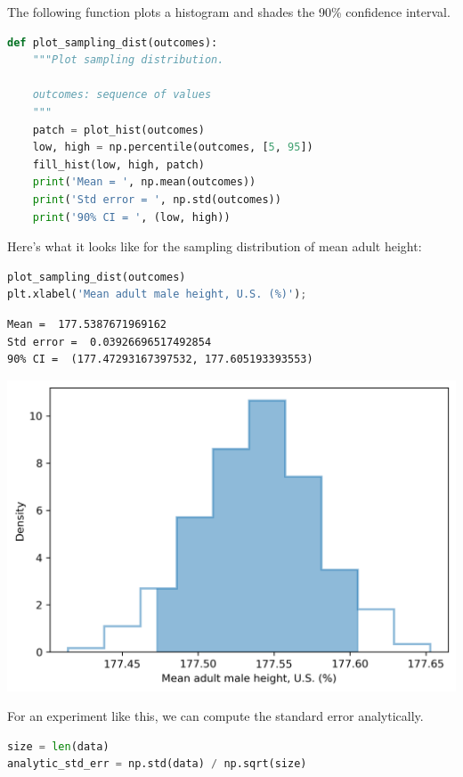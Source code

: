 The following function plots a histogram and shades the 90\% confidence
interval.

\begin{lstlisting}[language=Python,style=source]
def plot_sampling_dist(outcomes):
    """Plot sampling distribution.
    
    outcomes: sequence of values
    """
    patch = plot_hist(outcomes)
    low, high = np.percentile(outcomes, [5, 95])
    fill_hist(low, high, patch)
    print('Mean = ', np.mean(outcomes))
    print('Std error = ', np.std(outcomes))
    print('90% CI = ', (low, high))
\end{lstlisting}

Here's what it looks like for the sampling distribution of mean adult
height:

\begin{lstlisting}[language=Python,style=source]
plot_sampling_dist(outcomes)
plt.xlabel('Mean adult male height, U.S. (%)');
\end{lstlisting}

\begin{lstlisting}[style=output]
Mean =  177.5387671969162
Std error =  0.03926696517492854
90% CI =  (177.47293167397532, 177.605193393553)
\end{lstlisting}

\begin{center}
\includegraphics[scale=0.75]{11_inference_files/11_inference_113_1.png}
\end{center}

For an experiment like this, we can compute the standard error
analytically.

\begin{lstlisting}[language=Python,style=source]
size = len(data)
analytic_std_err = np.std(data) / np.sqrt(size)
\end{lstlisting}

